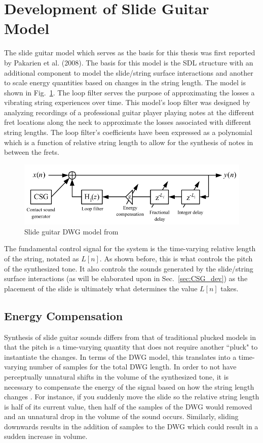 \documentclass[main.tex]{subfiles}
\begin{document}
\section{Development of Slide Guitar Model}
The slide guitar model which serves as the basis for this thesis was first reported by Pakarien et al. (2008). The basis for this model is the SDL structure with an additional component to model the slide/string surface interactions and another to scale energy quantities based on changes in the string length. The model is shown in Fig.~\ref{fig:original_DWG}. The loop filter serves the purpose of approximating the losses a vibrating string experiences over time. This model's loop filter was designed by analyzing recordings of a professional guitar player playing notes at the different fret locations along the neck to approximate the losses associated with different string lengths. The loop filter's coefficients have been expressed as a polynomial which is a function of relative string length to allow for the synthesis of notes in between the frets.

\begin{figure}[h]
    \centering
    \includegraphics[scale=.75]{./images/pictures/SDL_slide_model.png}
    \caption{Slide guitar DWG model from }
    \label{fig:original_DWG}
\end{figure}

The fundamental control signal for the system is the time-varying relative length of the string, notated as $L[n]$. As shown before, this is what controls the pitch of the synthesized tone. It also controls the sounds generated by the slide/string surface interactions (as will be elaborated upon in Sec.~\ref{sec:CSG_dev}) as the placement of the slide is ultimately what determines the value $L[n]$ takes.

\subsection{Energy Compensation}
Synthesis of slide guitar sounds differs from that of traditional plucked models in that the pitch is a time-varying quantity that does not require another ``pluck" to instantiate the changes. In terms of the DWG model, this translates into a time-varying number of samples for the total DWG length. In order to not have perceptually unnatural shifts in the volume of the synthesized tone, it is necessary to compensate the energy of the signal based on how the string length changes . For instance, if you suddenly move the slide so the relative string length is half of its current value, then half of the samples of the DWG would removed and an unnatural drop in the volume of the sound occurs. Similarly, sliding downwards results in the addition of samples to the DWG which could result in a sudden increase in volume. 
\end{document}
